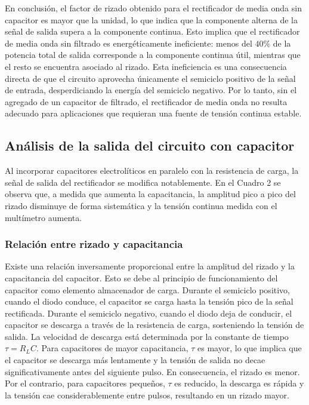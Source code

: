 En conclusión, el factor de rizado obtenido para el rectificador de media onda sin capacitor es mayor que la unidad, lo que indica que la componente alterna de la señal de salida supera a la componente continua. Esto implica que el rectificador de media onda sin filtrado es energéticamente ineficiente: menos del $40\%$ de la potencia total de salida corresponde a la componente continua útil, mientras que el resto se encuentra asociado al rizado. Esta ineficiencia es una consecuencia directa de que el circuito aprovecha únicamente el semiciclo positivo de la señal de entrada, desperdiciando la energía del semiciclo negativo. Por lo tanto, sin el agregado de un capacitor de filtrado, el rectificador de media onda no resulta adecuado para aplicaciones que requieran una fuente de tensión continua estable.



\subsection{Análisis de la salida del circuito con capacitor}



Al incorporar capacitores electrolíticos en paralelo con la resistencia de carga, la señal de salida del rectificador se modifica notablemente. En el Cuadro 2 se observa que, a medida que aumenta la capacitancia, la amplitud pico a pico del rizado disminuye de forma sistemática y la tensión continua medida con el multímetro aumenta.

\subsubsection{Relación entre rizado y capacitancia}

Existe una relación inversamente proporcional entre la amplitud del rizado y la capacitancia del capacitor. Esto se debe al principio de funcionamiento del capacitor como elemento almacenador de carga. Durante el semiciclo positivo, cuando el diodo conduce, el capacitor se carga hasta la tensión pico de la señal rectificada. Durante el semiciclo negativo, cuando el diodo deja de conducir, el capacitor se descarga a través de la resistencia de carga, sosteniendo la tensión de salida. La velocidad de descarga está determinada por la constante de tiempo $\tau = R_L C$. Para capacitores de mayor capacitancia, $\tau$ es mayor, lo que implica que el capacitor se descarga más lentamente y la tensión de salida no decae significativamente antes del siguiente pulso. En consecuencia, el rizado es menor. Por el contrario, para capacitores pequeños, $\tau$ es reducido, la descarga es rápida y la tensión cae considerablemente entre pulsos, resultando en un rizado mayor.

